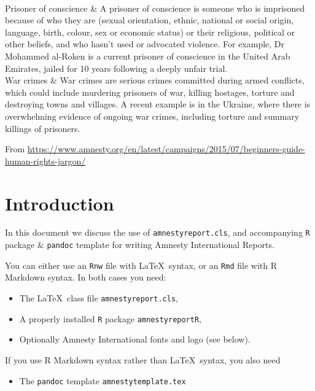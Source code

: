 \documentclass[
  freefonts, nologo]{amnestyreport}
\begin{document}
\begin{AmnestyGlossary}[10em]
\\
Prisoner of conscience &
A prisoner of conscience is someone who is imprisoned because of who they are (sexual orientation, ethnic, national or social origin, language, birth, colour, sex or economic status) or their religious, political or other beliefs, and who hasn’t used or advocated violence. For example, Dr Mohammed al-Roken is a current prisoner of conscience in the United Arab Emirates, jailed for 10 years following a deeply unfair trial.
\\
War crimes &
War crimes are serious crimes committed during armed conflicts, which could include murdering prisoners of war, killing hostages, torture and destroying towns and villages. A recent example is in the Ukraine, where there is overwhelming evidence of ongoing war crimes, including torture and summary killings of prisoners.
\\
\end{AmnestyGlossary}

From
\url{https://www.amnesty.org/en/latest/campaigns/2015/07/beginners-guide-human-rights-jargon/}

\clearpage

\section*{Introduction}\label{introduction}

In this document we discuss the use of \texttt{amnestyreport.cls}, and
accompanying \texttt{R} package \& \texttt{pandoc} template for writing
Amnesty International Reports.

You can either use an \texttt{Rnw} file with \LaTeX~syntax, or an
\texttt{Rmd} file with R Markdown syntax. In both cases you need:

\begin{itemize}
\tightlist
\item
  The \LaTeX~class file \texttt{amnestyreport.cls},
\item
  A properly installed \texttt{R} package \texttt{amnestyreportR},
\item
  Optionally Amnesty International fonts and logo (see below).
\end{itemize}

If you use R Markdown syntax rather than \LaTeX~syntax, you also need

\begin{itemize}
\tightlist
\item
  The \texttt{pandoc} template \texttt{amnestytemplate.tex}
\end{itemize}
\end{document}
